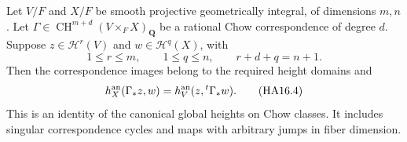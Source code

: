 \begin{theorem}
\label{r16ha:adjunction}
Let $V/F$ and $X/F$ be smooth projective geometrically integral,
of dimensions $m,n$. Let
$\Gamma\in\operatorname{CH}^{m+d}(V\times_FX)_{\mathbf Q}$
be a rational Chow correspondence of degree $d$. Suppose
$z\in\mathcal H^r(V)$ and $w\in\mathcal H^q(X)$, with
\[
 1\leq r\leq m,\qquad 1\leq q\leq n,\qquad
                         r+d+q=n+1.
 \tag{HA16.3}\label{r16ha:degrees}
\]
Then the correspondence images belong to the required height
domains and
\[
 h_X^{\rm an}(\Gamma_*z,w)
              =h_V^{\rm an}(z,{}^t\Gamma_*w).
 \tag{HA16.4}\label{r16ha:adjunction-eq}
\]
This is an identity of the canonical global heights on Chow
classes. It includes singular correspondence cycles and maps
with arbitrary jumps in fiber dimension.
\end{theorem}

